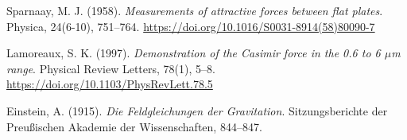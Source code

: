 \documentclass[12pt,a4paper]{article}
\begin{document}
\begin{thebibliography}{20}
		Sparnaay, M. J. (1958). 
		\textit{Measurements of attractive forces between flat plates}. 
		Physica, 24(6-10), 751--764. 
		\url{https://doi.org/10.1016/S0031-8914(58)80090-7}
		
		Lamoreaux, S. K. (1997). 
		\textit{Demonstration of the Casimir force in the 0.6 to 6 $\mu$m range}. 
		Physical Review Letters, 78(1), 5--8. 
		\url{https://doi.org/10.1103/PhysRevLett.78.5}
		
		Einstein, A. (1915). 
		\textit{Die Feldgleichungen der Gravitation}. 
		Sitzungsberichte der Preußischen Akademie der Wissenschaften, 844--847.
		
	\end{thebibliography}
	
\end{document}

